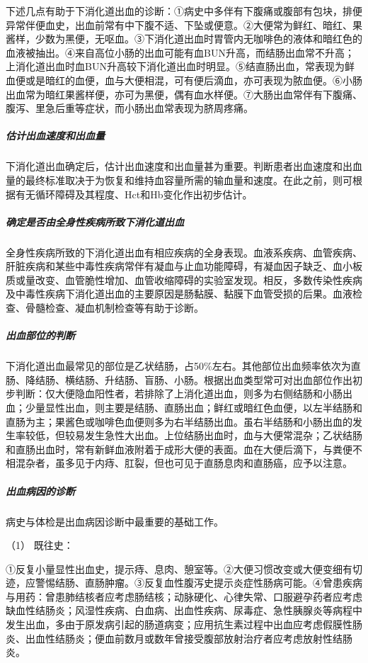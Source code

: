 下述几点有助于下消化道出血的诊断：①病史中多伴有下腹痛或腹部有包块，排便异常伴便血史，出血前常有中下腹不适、下坠或便意。②大便常为鲜红、暗红、果酱样，少数为黑便，无呕血。③下消化道出血时胃管内无咖啡色的液体和暗红色的血液被抽出。④来自高位小肠的出血可能有血BUN升高，而结肠出血常不升高；上消化道出血时血BUN升高较下消化道出血时明显。⑤结直肠出血，常表现为鲜血便或是暗红的血便，血与大便相混，可有便后滴血，亦可表现为脓血便。⑥小肠出血常为暗红果酱样便，亦可为黑便，偶有血水样便。⑦大肠出血常伴有下腹痛、腹泻、里急后重等症状，而小肠出血常表现为脐周疼痛。

\subparagraph{估计出血速度和出血量}

下消化道出血确定后，估计出血速度和出血量甚为重要。判断患者出血速度和出血量的最终标准取决于为恢复和维持血容量所需的输血量和速度。在此之前，则可根据有无循环障碍及其程度、Hct和Hb变化作出初步估计。

\subparagraph{确定是否由全身性疾病所致下消化道出血}

全身性疾病所致的下消化道出血有相应疾病的全身表现。血液系疾病、血管疾病、肝脏疾病和某些中毒性疾病常伴有凝血与止血功能障碍，有凝血因子缺乏、血小板质或量改变、血管脆性增加、血管收缩障碍的实验室发现。相反，多数传染性疾病及中毒性疾病下消化道出血的主要原因是肠黏膜、黏膜下血管受损的后果。血液检查、骨髓检查、凝血机制检查等有助于诊断。

\subparagraph{出血部位的判断}

下消化道出血最常见的部位是乙状结肠，占50\%左右。其他部位出血频率依次为直肠、降结肠、横结肠、升结肠、盲肠、小肠。根据出血类型常可对出血部位作出初步判断：仅大便隐血阳性者，若排除了上消化道出血，则多为右侧结肠和小肠出血；少量显性出血，则主要是结肠、直肠出血；鲜红或暗红色血便，以左半结肠和直肠为主；果酱色或咖啡色血便则多为右半结肠出血。虽右半结肠和小肠出血的发生率较低，但较易发生急性大出血。上位结肠出血时，血与大便常混杂；乙状结肠和直肠出血时，常有新鲜血液附着于成形大便的表面。血在大便后滴下，与粪便不相混杂者，虽多见于内痔、肛裂，但也可见于直肠息肉和直肠癌，应予以注意。

\subparagraph{出血病因的诊断}

病史与体检是出血病因诊断中最重要的基础工作。

\hypertarget{text00033.htmlux5cux23CHP1-13-2-1-5-1}{}
（1） 既往史：

①反复小量显性出血史，提示痔、息肉、憩室等。②大便习惯改变或大便变细有切迹，应警惕结肠、直肠肿瘤。③反复血性腹泻史提示炎症性肠病可能。④曾患疾病与用药：曾患肺结核者应考虑肠结核；动脉硬化、心律失常、口服避孕药者应考虑缺血性结肠炎；风湿性疾病、白血病、出血性疾病、尿毒症、急性胰腺炎等病程中发生出血，多由于原发病引起的肠道病变；应用抗生素过程中出血应考虑假膜性肠炎、出血性结肠炎；便血前数月或数年曾接受腹部放射治疗者应考虑放射性结肠炎。

